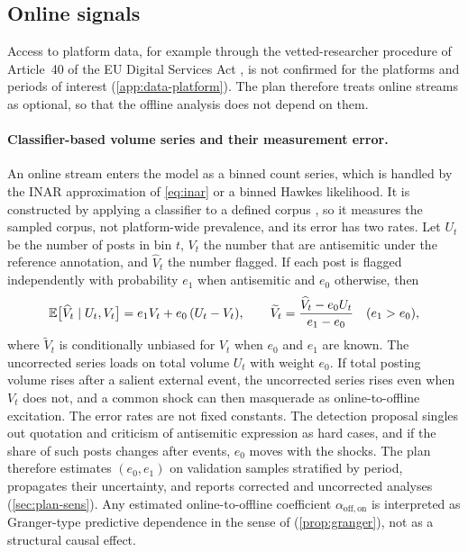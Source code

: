 \subsection{Online signals}\label{sec:data-online}

Access to platform data, for example through the vetted-researcher procedure of
Article~40 of the EU Digital Services Act \citep{eu2022dsa}, is not confirmed for the
platforms and periods of interest (\cref{app:data-platform}). The plan therefore treats
online streams as optional, so that the offline analysis does not depend on them.

\paragraph{Classifier-based volume series and their measurement error.}
An online stream enters the model as a binned count series, which is handled
by the INAR approximation of \cref{eq:inar} or a binned Hawkes likelihood.
It is constructed by applying a classifier to a defined corpus
\citep{kornsteinlab2026detection,kornsteinlab2026measurement}, so it measures the
sampled corpus, not platform-wide prevalence, and its error has two rates. Let $U_t$ be the number of posts in bin $t$, $V_t$ the
number that are antisemitic under the reference annotation, and
$\widehat V_t$ the number flagged. If each post is flagged independently
with probability $e_1$ when antisemitic and $e_0$ otherwise, then
\begin{equation}\label{eq:data-classerr}
  \mathbb{E}\bigl[\widehat V_t \mid U_t, V_t\bigr]
  = e_1 V_t + e_0\,(U_t - V_t),
  \qquad
  \widetilde V_t = \frac{\widehat V_t - e_0 U_t}{e_1 - e_0}
  \quad (e_1 > e_0),
\end{equation}
where $\widetilde V_t$ is conditionally unbiased for $V_t$ when $e_0$ and
$e_1$ are known. The uncorrected series loads on total volume $U_t$ with
weight $e_0$. If total posting volume rises after a salient external
event, the uncorrected series rises even when $V_t$ does not, and a common
shock can then masquerade as online-to-offline excitation. The error rates
are not fixed constants. The detection proposal singles out quotation and
criticism of antisemitic expression as hard cases, and if the share of such
posts changes after events, $e_0$ moves with the shocks. The plan
therefore estimates $(e_0, e_1)$ on validation samples stratified by
period, propagates their uncertainty, and reports corrected and uncorrected
analyses (\cref{sec:plan-sens}). Any estimated online-to-offline coefficient
$\alpha_{\mathrm{off},\mathrm{on}}$ is interpreted as Granger-type
predictive dependence in the sense of \citet{eichler2017}
(\cref{prop:granger}), not as a structural causal effect.

